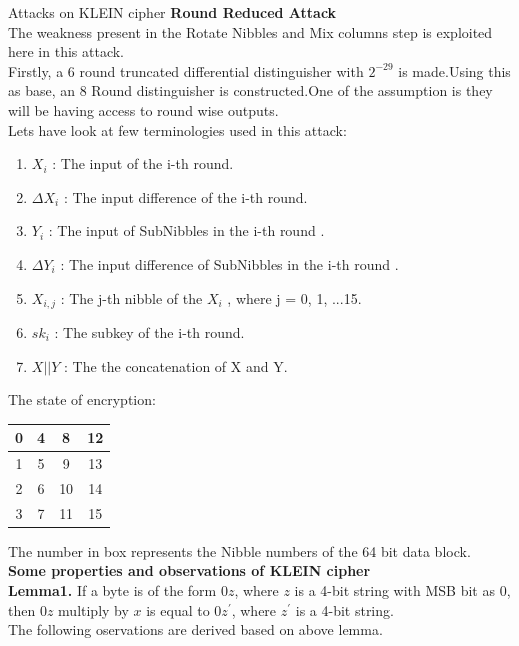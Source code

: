\begin{frame}{Attacks on KLEIN cipher}
\textbf{Round Reduced Attack}\\
The weakness present in the Rotate Nibbles and Mix columns step is exploited here in this attack.\\
Firstly, a 6 round truncated differential distinguisher with $2^{-29}$ is made.Using this as base, an 8 Round distinguisher is constructed.One of the assumption is they will be having access to round wise outputs.\\
Lets have look at few terminologies used in this attack:\\
\begin{enumerate}
    \item $X_{i}$ : The input of the i-th round.
    \item $\Delta X_{i}$ : The input difference of the i-th round.
    \item $Y_{i}$ : The input of SubNibbles in the i-th round .
    \item $\Delta Y_{i}$ : The input difference of SubNibbles in the i-th round .
    \item $X_{i,j}$ : The j-th nibble of the $X_{i}$ , where j = 0, 1, ...15.
    \item $sk_{i}$ : The subkey of the i-th round.
    \item $X || Y$ : The the concatenation of X and Y.
\end{enumerate}
\end{frame}

\begin{frame}
The state of encryption: \\
\begin{center}
\begin{tabular}{|c|c|c|c|}
\hline
0&4&8&12\\
\hline
1&5&9&13\\
\hline
2&6&10&14 \\
\hline
3&7&11&15\\  
\hline
\end{tabular}
\end{center}
The number in box represents the Nibble numbers of the 64 bit data block.
\textbf{Some properties and observations of KLEIN cipher}\\
\textbf{Lemma1.} If a byte is of the form $0z$, where $z$ is a 4-bit string
with MSB bit as 0, then $0z$ multiply by $x$ is equal to $0z^{'}$, where $z ^{'}$
is a 4-bit string.\\
The following oservations are derived based on above lemma.\\ \\

\end{frame}

